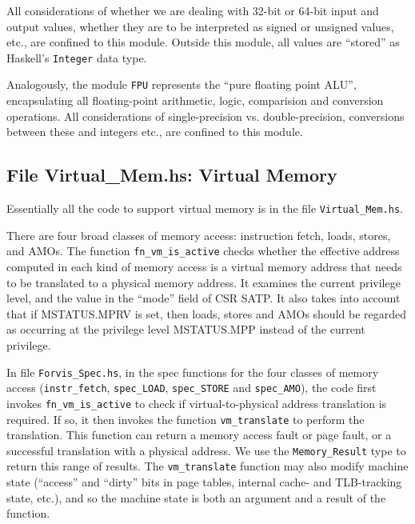 \documentclass[11pt]{article}
\begin{document}
All considerations of whether we are dealing with 32-bit or 64-bit
input and output values, whether they are to be interpreted as signed
or unsigned values, etc., are confined to this module.  Outside this
module, all values are ``stored'' as Haskell's \verb|Integer| data
type.

Analogously, the module \verb|FPU| represents the ``pure floating
point ALU'', encapsulating all floating-point arithmetic, logic,
comparision and conversion operations. All considerations of
single-precision vs. double-precision, conversions between these and
integers etc., are confined to this module.


\subsection{File Virtual\_Mem.hs: Virtual Memory}

\label{sec_vm}

Essentially all the code to support virtual memory is in the file
\verb|Virtual_Mem.hs|.

There are four broad classes of memory access: instruction fetch,
loads, stores, and AMOs.  The function \verb|fn_vm_is_active| checks
whether the effective address computed in each kind of memory access
is a virtual memory address that needs to be translated to a physical
memory address.  It examines the current privilege level, and the
value in the ``mode'' field of CSR SATP.  It also takes into account
that if MSTATUS.MPRV is set, then loads, stores and AMOs should be
regarded as occurring at the privilege level MSTATUS.MPP instead of
the current privilege.



In file \verb|Forvis_Spec.hs|, in the spec functions for the four
classes of memory access (\verb|instr_fetch|, \verb|spec_LOAD|,
\verb|spec_STORE| and \verb|spec_AMO|), the code first invokes
\verb|fn_vm_is_active| to check if virtual-to-physical address
translation is required.  If so, it then invokes the function
\verb|vm_translate| to perform the translation.  This function can
return a memory access fault or page fault, or a successful
translation with a physical address.  We use the \verb|Memory_Result|
type to return this range of results.  The \verb|vm_translate|
function may also modify machine state (``access'' and ``dirty'' bits
in page tables, internal cache- and TLB-tracking state, etc.), and so
the machine state is both an argument and a result of the function.
\end{document}
